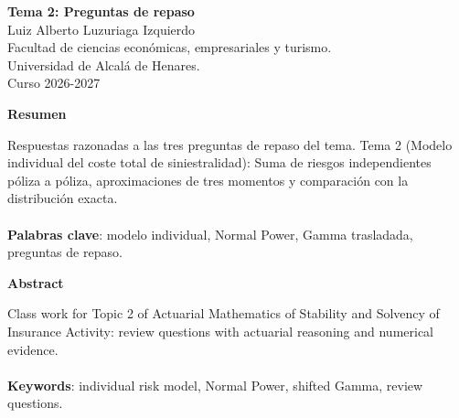 \documentclass[a4paper,12pt]{article}
\begin{document}
\begin{titlepage}
    \centering
    \vspace*{0.1cm}
    \huge\textbf{Tema 2: Preguntas de repaso}\\
    \vspace{1cm}
    \small{Luiz Alberto Luzuriaga Izquierdo}\\
    \vspace{0.1cm}
    Facultad de ciencias económicas, empresariales y turismo. \\
    \vspace{0.1cm}
    Universidad de Alcalá de Henares. \\
    \vspace{0.1cm}
    Curso 2026-2027\\
    \vspace{0.5cm}

{\bfseries Resumen}

\vspace{0.1cm}
\noindent
\begin{justify}
Respuestas razonadas a las tres preguntas de repaso del tema. Tema 2 (Modelo individual del coste total de siniestralidad): Suma de riesgos independientes póliza a póliza, aproximaciones de tres momentos y comparación con la distribución exacta.\\\\
\vspace{0.1cm}
\noindent
\textbf{Palabras clave}: modelo individual, Normal Power, Gamma trasladada, preguntas de repaso.
\end{justify}
\begin{center}
    {\bfseries Abstract}
\end{center}
\vspace{0.1cm}
\noindent
\begin{justify}
Class work for Topic 2 of Actuarial Mathematics of Stability and Solvency of Insurance Activity: review questions with actuarial reasoning and numerical evidence.\\\\
\vspace{0.1cm}
\noindent
\textbf{Keywords}: individual risk model, Normal Power, shifted Gamma, review questions.
\end{justify}

\end{titlepage}

\newpage{}
\renewcommand{\contentsname}{Índice}
\tableofcontents
\end{document}
